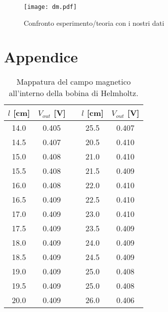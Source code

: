\begin{figure}[H]
	\centering
	\texttt{[image: dm.pdf]}
	\caption{Confronto esperimento/teoria con i nostri dati}
	\label{dati_nostri}
\end{figure}


\newpage
\section{Appendice}

	\begin{table}[h]
		\centering
		\begin{tabular}{ccccc}
			\toprule
			$l$ [\si{cm}]	& 	$V_{out}$ [\si{\volt}]	&& 	$l$ [\si{cm}]	& 	$V_{out}$ [\si{\volt}] \\
			\midrule
			14.0 	& 	 0.405	&&	25.5	& 	 0.407 \\
			14.5	& 	 0.407	&&	20.5	& 	 0.410 \\
			15.0	& 	 0.408	&&	21.0	& 	 0.410 \\
			15.5	& 	 0.408	&&	21.5	& 	 0.409 \\
			16.0	& 	 0.408	&&	22.0	& 	 0.410 \\
			16.5	& 	 0.409	&&	22.5	& 	 0.410 \\
			17.0	& 	 0.409	&&	23.0	& 	 0.410 \\
			17.5	& 	 0.409	&&	23.5	& 	 0.409 \\
			18.0	& 	 0.409	&&	24.0	& 	 0.409 \\
			18.5	& 	 0.409	&&	24.5	& 	 0.409 \\
			19.0	& 	 0.409	&&	25.0	& 	 0.408 \\
			19.5	& 	 0.409	&&	25.0	& 	 0.408 \\
			20.0	& 	 0.409	&&	26.0	& 	 0.406 \\
			\bottomrule
		\end{tabular}
		\caption{Mappatura del campo magnetico all'interno della bobina di Helmholtz.}
		\label{tab:a}
	\end{table}

